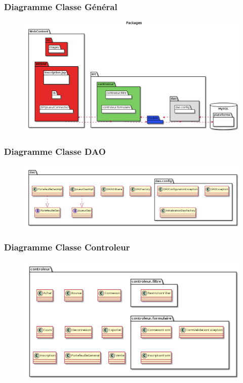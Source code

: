 \begin{frame}
    \frametitle{Diagramme Classe Général}
    \begin{figure}
        	\includegraphics[scale=0.25]{images/packages.png}

    \end{figure}
\end{frame}

\begin{frame}
    \frametitle{Diagramme Classe DAO}
    \begin{figure}
    

    	\includegraphics[scale=0.30]{images/packageDAO.png}
    	\end{figure}
\end{frame}

\begin{frame}
    \frametitle{Diagramme Classe Controleur}
    \begin{figure}

    	\includegraphics[scale=0.30]{images/packageControleur.png}
    	    	\end{figure}

\end{frame}

